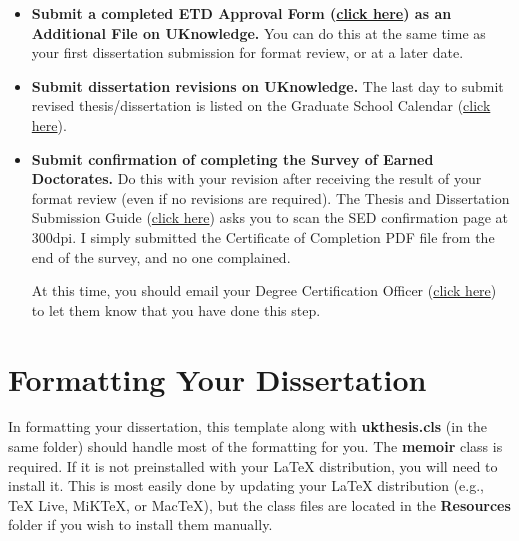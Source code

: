 \documentclass[final]{ukthesis} %
\begin{document}
\begin{itemize}
Details for submitting this are in the Thesis and Dissertation Submission Guide (\href{https://uknowledge.uky.edu/cgi/viewcontent.cgi?referer=http://gradschool.uky.edu/electronic-dissertation-defense&httpsredir=1&article=1006&context=uknowledge_docs}{click here}).

\item \textbf{Submit a completed ETD Approval Form (\href{http://gradschool.uky.edu/sites/gradschool.uky.edu/files/Forms/StudentForms/ETDApprovalForm_0.pdf}{click here}) as an Additional File on UKnowledge.} You can do this at the same time as your first dissertation submission for format review, or at a later date.

\item \textbf{Submit dissertation revisions on UKnowledge.} The last day to submit revised thesis/dissertation is listed on the Graduate School Calendar (\href{http://gradschool.uky.edu/key-dates}{click here}).

\item \textbf{Submit confirmation of completing the Survey of Earned Doctorates.} Do this with your revision after receiving the result of your format review (even if no revisions are required). The Thesis and Dissertation Submission Guide (\href{https://uknowledge.uky.edu/cgi/viewcontent.cgi?referer=http://gradschool.uky.edu/electronic-dissertation-defense&httpsredir=1&article=1006&context=uknowledge_docs}{click here}) asks you to scan the SED confirmation page at 300dpi. I simply submitted the Certificate of Completion PDF file from the end of the survey, and no one complained.

At this time, you should email your Degree Certification Officer (\href{http://gradschool.uky.edu/academic-affairs-officers}{click here}) to let them know that you have done this step.

\end{itemize}

\section{Formatting Your Dissertation}

In formatting your dissertation, this template along with \textbf{ukthesis.cls} (in the same folder) should handle most of the formatting for you. The \textbf{memoir} class is required. If it is not preinstalled with your {\LaTeX} distribution, you will need to install it. This is most easily done by updating your {\LaTeX} distribution (e.g., TeX Live, MiKTeX, or MacTeX), but the class files are located in the \textbf{Resources} folder if you wish to install them manually.
\end{document}
